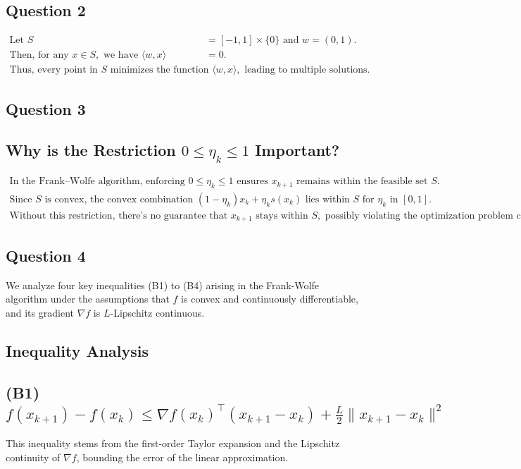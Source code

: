 \documentclass[12p]{article}
\begin{document}
\subsection*{Question 2} 
\begin{align*}
\text{Let } S &= [-1,1] \times \{0\} \text{ and } w = (0, 1). \\
\text{Then, for any } x \in S, \text{ we have } \langle w, x \rangle &= 0. \\
\text{Thus, every point in } S \text{ minimizes the function } \langle w, x \rangle, \text{ leading to multiple solutions.}
\end{align*}

\subsection*{Question 3} 

\subsection*{Why is the Restriction \( 0 \leq \eta_k \leq 1 \) Important?}
\begin{align*}
\text{In the Frank–Wolfe algorithm, enforcing } 0 \leq \eta_k \leq 1 \text{ ensures } x_{k+1} \text{ remains within the feasible set } S. \\
\text{Since } S \text{ is convex, the convex combination } (1 - \eta_k)x_k + \eta_k s(x_k) \text{ lies within } S \text{ for } \eta_k \text{ in } [0, 1]. \\
\text{Without this restriction, there's no guarantee that } x_{k+1} \text{ stays within } S, \text{ possibly violating the optimization problem constraints.}
\end{align*}

\subsection*{Question 4} 

We analyze four key inequalities (B1) to (B4) arising in the Frank-Wolfe algorithm under the assumptions that \( f \) is convex and continuously differentiable, and its gradient \( \nabla f \) is \( L \)-Lipschitz continuous.

\subsection*{Inequality Analysis}

\subsection*{(B1) \( f(x_{k+1}) - f(x_k) \leq \nabla f(x_k)^\top (x_{k+1} - x_k) + \frac{L}{2} \|x_{k+1} - x_k\|^2 \)}
This inequality stems from the first-order Taylor expansion and the Lipschitz continuity of \( \nabla f \), bounding the error of the linear approximation.
\end{document}

